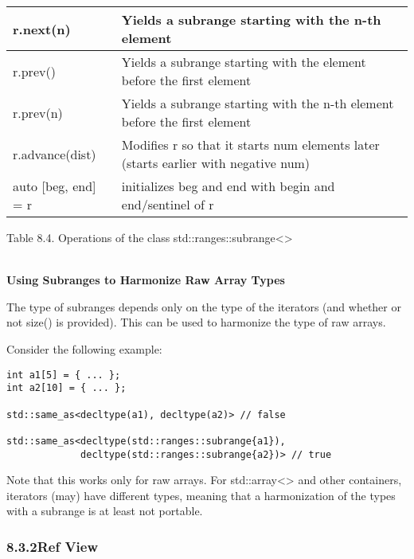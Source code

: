 \begin{table}[H]
\begin{tabular}{|l|l|}
	r.next(n)               & Yields a subrange starting with the n-th element                          \\ \hline
	r.prev()                & Yields a subrange starting with the element before the first element      \\ \hline
	r.prev(n)               & Yields a subrange starting with the n-th element before the first element \\ \hline
	r.advance(dist)                & Modifies r so that it starts num elements later (starts earlier with negative num)                       \\ \hline
	auto {[}beg, end{]} = r & initializes beg and end with begin and end/sentinel of r                  \\ \hline
\end{tabular}
\end{table}

\begin{center}
Table 8.4. Operations of the class std::ranges::subrange<>
\end{center}

\noindent
\hspace*{\fill} \\ %
\textbf{Using Subranges to Harmonize Raw Array Types}

The type of subranges depends only on the type of the iterators (and whether or not size() is provided).
This can be used to harmonize the type of raw arrays.

Consider the following example:

\begin{lstlisting}[style=styleCXX]
int a1[5] = { ... };
int a2[10] = { ... };

std::same_as<decltype(a1), decltype(a2)> // false

std::same_as<decltype(std::ranges::subrange{a1}),
			 decltype(std::ranges::subrange{a2})> // true
\end{lstlisting}

Note that this works only for raw arrays. For std::array<> and other containers, iterators (may) have different types, meaning that a harmonization of the types with a subrange is at least not portable.

\subsubsection*{ 8.3.2\hspace{0.2cm}Ref View}

